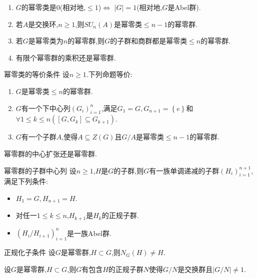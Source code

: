 \begin{example}{}{}
	\begin{enumerate}
		\item $G$的幂零类是$0$(相对地,$\leq 1$)$\iff$ $\left|G\right|=1$(相对地,$G$是Abel群).
		\item 若$A$是交换环,$n\geq 1$,则$SU_{n}\left(A\right)$是幂零类$\leq n-1$的幂零群.
		\item 若$G$是幂零类为$n$的幂零群,则$G$的子群和商群都是幂零类$\leq n$的幂零群.
		\item 有限个幂零群的乘积还是幂零群.
	\end{enumerate}
\end{example}

\begin{proposition}{幂零类的等价条件}{}
	设$n\geq 1$.下列命题等价:
	\begin{enumerate}
		\item $G$是幂零类$\leq n$的幂零群.
		\item $G$有一个下中心列$\left(G_{i}\right)_{i=1}^{n}$,满足$G_{1}=G,G_{n+1}=\left\{e\right\}$和$\forall 1\leq k\leq n\left(\left[G,G_{k}\right]\subseteq G_{k+1}\right)$.
		\item $G$有一个子群$A$,使得$A\subseteq Z\left(G\right)$且$G/A$是幂零类$\leq n-1$的幂零群.
	\end{enumerate}
\end{proposition}

\begin{corollary}{}{}
	幂零群的中心扩张还是幂零群.
\end{corollary}

\begin{corollary}{幂零群的子群中心列}{}
	设$n\geq 1$,$H$是$G$的子群,则$G$有一族单调递减的子群$\left(H_{i}\right)_{i=1}^{n+1}$,满足下列条件:
	\begin{itemize}
		\item $H_{1}=G,H_{n+1}=H$.
		\item 对任一$1\leq k\leq n$,$H_{k+1}$是$H_{k}$的正规子群.
		\item $\left(H_{i}/H_{i+1}\right)_{i=1}^{n}$是一族Abel群.
	\end{itemize}
\end{corollary}

\begin{corollary}{正规化子条件}{}
	设$G$是幂零群,$H\subset G$,则$N_{G}\left(H\right)\neq H$.
\end{corollary}

\begin{corollary}{}{}
	设$G$是幂零群,$H\subset G$,则$G$有包含$H$的正规子群$N$使得$G/N$是交换群且$\left|G/N\right|\neq 1$.
\end{corollary}

